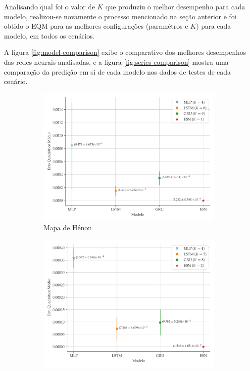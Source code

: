 \documentclass{article}
\begin{document}
Analisando qual foi o valor de $K$ que produziu o melhor desempenho para cada modelo, realizou-se novamente o processo mencionado na seção anterior e foi obtido o EQM para as melhores configurações (paramêtros e $K$) para cada modelo, em todos os cenários. 

A figura \ref{fig:model-comparison} exibe o comparativo dos melhores desempenhos das redes neurais analisadas, e a figura \ref{fig:series-comparison} mostra uma comparação da predição em si de cada modelo nos dados de testes de cada cenário.
\begin{figure}[!h]
     \begin{subfigure}[t]{0.2\textwidth}
         \includegraphics[scale=0.2]{comparacao-k-henon.pdf}
         \caption{Mapa de Hénon}
     \end{subfigure}
     \centering
     \begin{subfigure}[t]{0.2\textwidth} 
         \includegraphics[scale=0.2]{comparacao-k-logistic.pdf}

\end{subfigure}
\end{figure}
\end{document}
